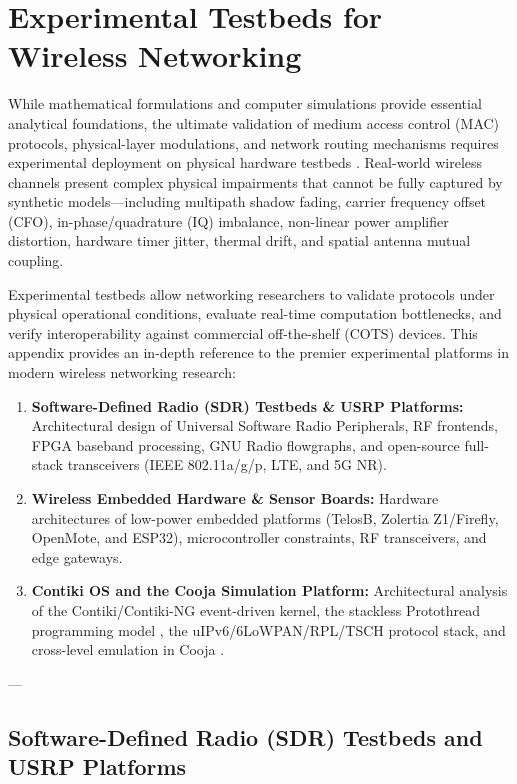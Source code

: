 \chapter{Experimental Testbeds for Wireless Networking}
\label{sec:appendix_testbeds}

While mathematical formulations and computer simulations provide essential analytical foundations, the ultimate validation of medium access control (MAC) protocols, physical-layer modulations, and network routing mechanisms requires experimental deployment on physical hardware testbeds \cite{kumar2008wireless, dunkels2004contiki}. Real-world wireless channels present complex physical impairments that cannot be fully captured by synthetic models—including multipath shadow fading, carrier frequency offset (CFO), in-phase/quadrature (IQ) imbalance, non-linear power amplifier distortion, hardware timer jitter, thermal drift, and spatial antenna mutual coupling.

Experimental testbeds allow networking researchers to validate protocols under physical operational conditions, evaluate real-time computation bottlenecks, and verify interoperability against commercial off-the-shelf (COTS) devices. This appendix provides an in-depth reference to the premier experimental platforms in modern wireless networking research:
\begin{enumerate}
    \item \textbf{Software-Defined Radio (SDR) Testbeds \& USRP Platforms:} Architectural design of Universal Software Radio Peripherals, RF frontends, FPGA baseband processing, GNU Radio flowgraphs, and open-source full-stack transceivers (IEEE 802.11a/g/p, LTE, and 5G NR).
    \item \textbf{Wireless Embedded Hardware \& Sensor Boards:} Hardware architectures of low-power embedded platforms (TelosB, Zolertia Z1/Firefly, OpenMote, and ESP32), microcontroller constraints, RF transceivers, and edge gateways.
    \item \textbf{Contiki OS and the Cooja Simulation Platform:} Architectural analysis of the Contiki/Contiki-NG event-driven kernel, the stackless Protothread programming model \cite{dunkels2006protothreads}, the uIPv6/6LoWPAN/RPL/TSCH protocol stack, and cross-level emulation in Cooja \cite{osterlind2006cross}.
\end{enumerate}

---

\section{Software-Defined Radio (SDR) Testbeds and USRP Platforms}
\label{sec:sdr_usrp}

